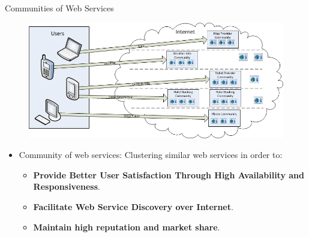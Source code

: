 \documentclass{beamer}
\begin{document}
\begin{frame}{Communities of Web Services}
    \begin{figure}[htbp]
        \centering
        \includegraphics[width=0.9 \columnwidth]{figures/wsinternet2.png}
    \end{figure}

    \begin{itemize}
        \item Community of web services: Clustering similar web services in order to:
        \begin{itemize}
            \item \textbf{Provide Better User Satisfaction Through High Availability and Responsiveness}.
            \item \textbf{Facilitate Web Service Discovery over Internet}.
            \item \textbf{Maintain high reputation and market share}.
        \end{itemize}
    \end{itemize}
\end{frame}
\end{document}
